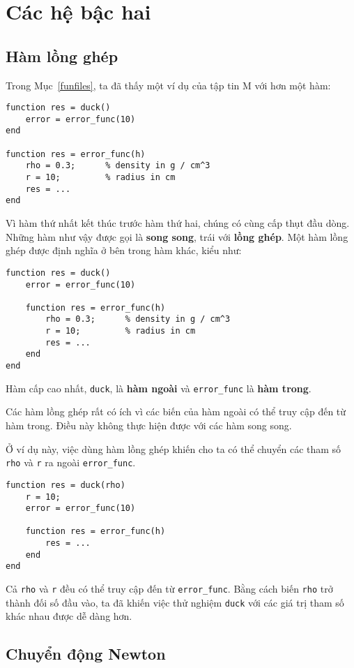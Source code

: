 \documentclass[12pt]{book}
\begin{document}
\chapter{Các hệ bậc hai}


\section{Hàm lồng ghép}

Trong Mục~\ref{funfiles}, ta đã thấy một ví dụ của tập tin M với
hơn một hàm:

\begin{verbatim}
function res = duck()
    error = error_func(10)
end

function res = error_func(h)
    rho = 0.3;      % density in g / cm^3
    r = 10;         % radius in cm
    res = ...
end
\end{verbatim}
%
Vì hàm thứ nhất kết thúc trước hàm thứ hai, chúng có cùng cấp
thụt đầu dòng. Những hàm như vậy được gọi là 
{\bf song song}, trái với {\bf lồng ghép}. Một hàm lồng ghép
được định nghĩa ở bên trong hàm khác, kiểu như:

\begin{verbatim}
function res = duck()
    error = error_func(10)

    function res = error_func(h)
        rho = 0.3;      % density in g / cm^3
        r = 10;         % radius in cm
        res = ...
    end
end
\end{verbatim}
%
Hàm cấp cao nhất, {\tt duck}, là 
{\bf hàm ngoài} và \verb#error_func# là
{\bf hàm trong}.

Các hàm lồng ghép rất có ích vì các biến của hàm ngoài có thể
truy cập đến từ hàm trong. Điều này không thực hiện được với
các hàm song song.

Ở ví dụ này, việc dùng hàm lồng ghép khiến cho ta có thể chuyển
các tham số {\tt rho} và {\tt r} ra ngoài \verb#error_func#.

\begin{verbatim}
function res = duck(rho)
    r = 10;
    error = error_func(10)

    function res = error_func(h)
        res = ...
    end
end
\end{verbatim}
%
Cả {\tt rho} và {\tt r} đều có thể truy cập đến từ 
\verb#error_func#. Bằng cách biến {\tt rho} trở thành đối số
đầu vào, ta đã khiến việc thử nghiệm {\tt duck} với các giá
trị tham số khác nhau được dễ dàng hơn.



\section{Chuyển động Newton}
\end{document}
